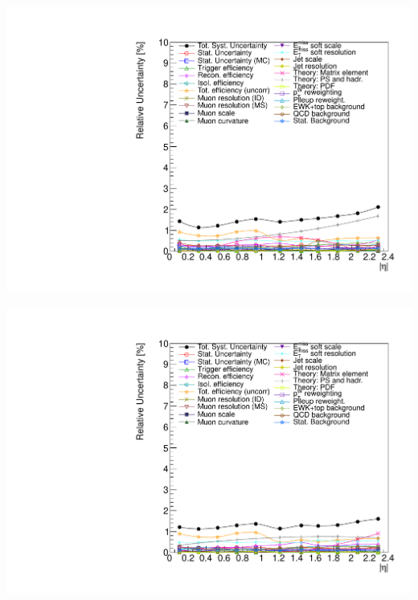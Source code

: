 {
\colb[T]
\centering
{}
\includegraphics[width=1.0\textwidth]{dates/20130602/figures/v26.allqcd/Wmn_SYSTEM_2D_PT20_NEG_Unc_2d_Slice_4}

\centering
{}
\includegraphics[width=1.0\textwidth]{dates/20130602/figures/v26.allqcd/Wmn_SYSTEM_2D_PT20_POS_Unc_2d_Slice_4}
\cole
}

